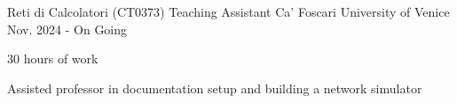 
\begin{cventries}

    \cventry
        {Reti di Calcolatori (CT0373)} %
        {Teaching Assistant} %
        {Ca' Foscari University of Venice} %
        {Nov. 2024 - On Going} %
        {
                \begin{cvitems} %
                        \item {30 hours of work}
                        \item {Assisted professor in documentation setup and building a network simulator}
                \end{cvitems}
        }
\end{cventries}